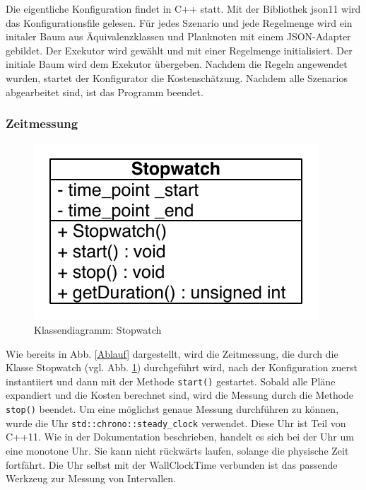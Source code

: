 \begin{minipage}{\linewidth}

\linespread{0.5}
\end{minipage}


Die eigentliche Konfiguration findet in C++ statt. Mit der Bibliothek json11 \cite{json11} wird das Konfigurationsfile gelesen. Für jedes Szenario und jede Regelmenge wird ein initaler Baum aus Äquivalenzklassen und Planknoten mit einem JSON-Adapter gebildet. Der Exekutor wird gewählt und mit einer Regelmenge initialisiert. Der initiale Baum wird dem Exekutor übergeben. Nachdem die Regeln angewendet wurden, startet der Konfigurator die Kostenschätzung. Nachdem alle Szenarios abgearbeitet sind, ist das Programm beendet.

\subsubsection{Zeitmessung}

\begin{figure}[ht]
  \centering
  \includegraphics{04_Implementierung/00_media/Stopwatch.pdf}
  \caption{Klassendiagramm: Stopwatch}
  \label{ClassStopwatch}
\end{figure}

Wie bereits in Abb. \ref{Ablauf} dargestellt, wird die Zeitmessung, die durch die Klasse Stopwatch (vgl. Abb. \ref{ClassStopwatch}) durchgeführt wird, nach der Konfiguration zuerst instantiiert und dann mit der Methode \texttt{start()} gestartet. Sobald alle Pläne expandiert und die Kosten berechnet sind, wird die Messung durch die Methode \texttt{stop()} beendet. Um eine möglichst genaue Messung durchführen zu können, wurde die Uhr \texttt{std::chrono::steady\_clock} verwendet. Diese Uhr ist Teil von C++11. Wie in der Dokumentation \cite{cppreference_2015_clock} beschrieben, handelt es sich bei der Uhr um eine monotone Uhr. Sie kann nicht rückwärts laufen, solange die physische Zeit fortfährt. Die Uhr selbst mit der Wall\-Clock\-Time verbunden ist das passende Werkzeug zur Messung von Intervallen. 


